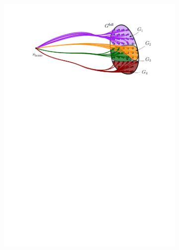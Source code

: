 \documentclass[conference]{IEEEtran}
\begin{document}
\begin{figure}[t]
    \centering
    \begin{subfigure}{.225\textwidth}
        \includegraphics[width=\textwidth]{naive1}
        \caption{}
        \label{fig:naive1}
    \end{subfigure}
    \hfill
    \begin{subfigure}{0.225\textwidth}

\end{subfigure}
\end{figure}
\end{document}
